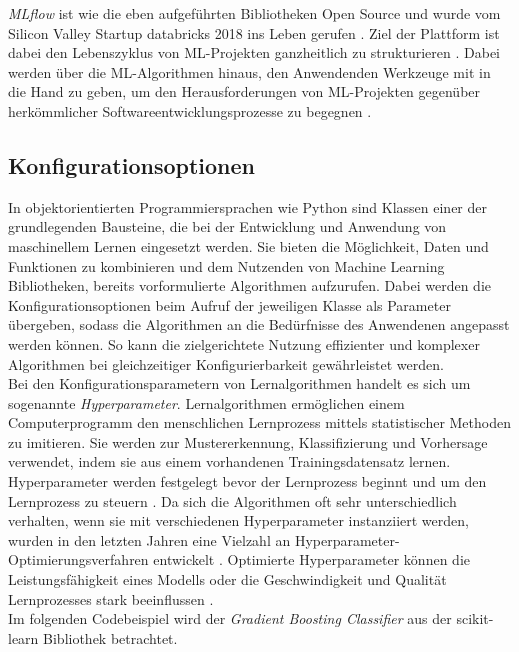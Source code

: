 \documentclass[german,bachelor]{swsLeipzig}
\begin{document}
\textit{MLflow} ist wie die eben aufgeführten Bibliotheken Open Source und wurde vom Silicon Valley Startup databricks 2018 ins Leben gerufen \cite[S. 39]{zaharia2018accelerating}.
Ziel der Plattform ist dabei den Lebenszyklus von ML-Projekten ganzheitlich zu strukturieren \cite[S. 39]{zaharia2018accelerating}.
Dabei werden über die ML-Algorithmen hinaus, den Anwendenden Werkzeuge mit in die Hand zu geben, um den Herausforderungen
von ML-Projekten gegenüber herkömmlicher Softwareentwicklungsprozesse zu begegnen \cite[S. 44]{zaharia2018accelerating}.\\


\subsection{Konfigurationsoptionen} \label{Konfigurationsoptionen}
In objektorientierten Programmiersprachen wie Python sind Klassen einer der grundlegenden Bausteine, die bei der Entwicklung und Anwendung
von maschinellem Lernen eingesetzt werden.
Sie bieten die Möglichkeit, Daten und Funktionen zu kombinieren und dem Nutzenden von Machine Learning Bibliotheken,
bereits vorformulierte Algorithmen aufzurufen.
Dabei werden die Konfigurationsoptionen beim Aufruf der jeweiligen Klasse als Parameter übergeben, sodass die Algorithmen
an die Bedürfnisse des Anwendenen angepasst werden können.
So kann die zielgerichtete Nutzung effizienter und komplexer Algorithmen bei gleichzeitiger Konfigurierbarkeit gewährleistet werden. \\

Bei den Konfigurationsparametern von Lernalgorithmen handelt es sich um sogenannte \textit{Hyperparameter}.
Lernalgorithmen ermöglichen einem Computerprogramm den menschlichen Lernprozess mittels statistischer Methoden zu imitieren.
Sie werden zur Mustererkennung, Klassifizierung und Vorhersage verwendet, indem sie aus einem vorhandenen Trainingsdatensatz
lernen.
Hyperparameter werden festgelegt bevor der Lernprozess beginnt und um den Lernprozess zu steuern \cite[S. 280]{hype}.
Da sich die Algorithmen oft sehr unterschiedlich verhalten, wenn sie mit verschiedenen Hyperparameter instanziiert werden,
wurden in den letzten Jahren eine Vielzahl an Hyperparameter-Optimierungsverfahren entwickelt \cite[S. 1]{pmlr-v32-hutter14}.
Optimierte Hyperparameter können die Leistungsfähigkeit eines Modells oder die Geschwindigkeit und Qualität Lernprozesses stark beeinflussen \cite[S. 280]{hype}.\\

Im folgenden Codebeispiel wird der \textit{Gradient Boosting Classifier} aus der scikit-learn Bibliothek betrachtet.\\
\end{document}
